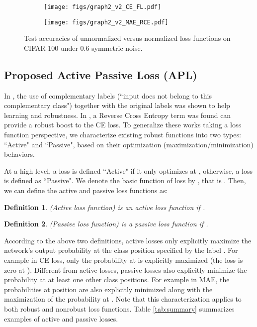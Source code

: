 \documentclass{article}
\newtheorem{definition}{Definition}
\begin{document}
\begin{figure}[!ht]
	\centering
	\begin{subfigure}{0.48\linewidth}
		\texttt{[image: figs/graph2\_v2\_CE\_FL.pdf]}
		\label{ce_nce_100}
	\end{subfigure}
	\begin{subfigure}{0.48\linewidth} 
		\texttt{[image: figs/graph2\_v2\_MAE\_RCE.pdf]}
		\label{fl_nfl_100}
	\end{subfigure}
	\vspace{-0.15 in}
	\caption{Test accuracies of unnormalized versus normalized loss functions on CIFAR-100 under 0.6 symmetric noise.}
	\vspace{-0.15 in}
	\label{fig:1}
\end{figure}


\subsection{Proposed Active Passive Loss (APL)}\label{sec:pos_neg}
In \cite{kim2019nlnl}, the use of complementary labels (``input does not belong to this complementary class") together with the original labels was shown to help learning and robustness.
In \cite{wang2019symmetric}, a Reverse Cross Entropy term was found can provide a robust boost to the CE loss. To generalize these works taking a loss function perspective, we characterize existing robust functions into two types: ``Active" and ``Passive", based on their optimization (maximization/minimization) behaviors.

At a high level, a loss is defined ``Active" if it only optimizes at , otherwise, a loss is defined as ``Passive". We denote the basic function of loss  by , that is . Then, we can define the active and passive loss functions as:


\begin{definition}{(Active loss function)}
 is an active loss function if .
\end{definition}

\begin{definition}{(Passive loss function)}
 is a passive loss function if
.
\end{definition}


According to the above two definitions, active losses only explicitly maximize the network's output probability at the class position specified by the label . For example in CE loss, only the probability at  is explicitly maximized (the loss is zero at ). Different from active losses, passive losses also explicitly minimize the probability at at least one other class positions. For example in MAE, the probabilities at position  are also explicitly minimized along with 
the maximization of the probability at . Note that this characterization applies to both robust and nonrobust loss functions. Table \ref{tab:summary} summarizes examples of active and passive losses.
\end{document}
